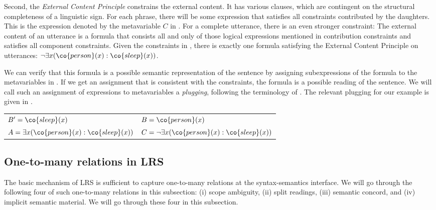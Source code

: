 \documentclass[output=paper]{langsci/langscibook}
\begin{document}
Second, the \emph{External Content Principle} constrains the external content. It has various clauses, which are contingent on 
 the structural completeness of a linguistic sign. 
For each phrase, there will be some expression that satisfies all constraints contributed by the daughters. 
This is the expression denoted by the metavariable $C$ in . 
For a complete utterance, there is an even stronger constraint: The external content of an utterance is a formula that consists all and only of those logical expressions mentioned in contribution constraints and satisfies all component constraints. Given the constraints in , there is exactly one formula satisfying the External Content Principle on utterances: $\lnot \exists x (\co{person}(x) : \co{sleep}(x))$.

We can verify that this formula is a possible semantic representation of the sentence by assigning  subexpressions of the formula to the metavariables in . 
If we get an assignment that is consistent with the constraints, the formula is a possible reading of the sentence. 
We will call such an assignment of expressions to metavariables a \emph{plugging}, following the terminology of \citet{Bos:96}.
The relevant plugging for our example is given in .



\ea \label{schlaeft-plug}
\begin{tabular}[t]{ll}
$B' = \co{sleep}(x)$ & 
$B = \co{person}(x)$\\
$A = \exists x (\co{person}(x):\co{sleep}(x))$ & 
$C = \lnot \exists x (\co{person}(x):\co{sleep}(x))$
\end{tabular}

\z




\subsection{One-to-many relations in LRS}
\label{Sec-LRS-One2Many}

The basic mechanism of LRS is sufficient to capture one-to-many relations at the syntax-semantics interface. 
We will go through the following four of such one-to-many relations in this subsection: (i) scope ambiguity, (ii) split readings, (iii) semantic concord, and (iv) implicit semantic material. 
We will go through these four in this subsection.
\end{document}
